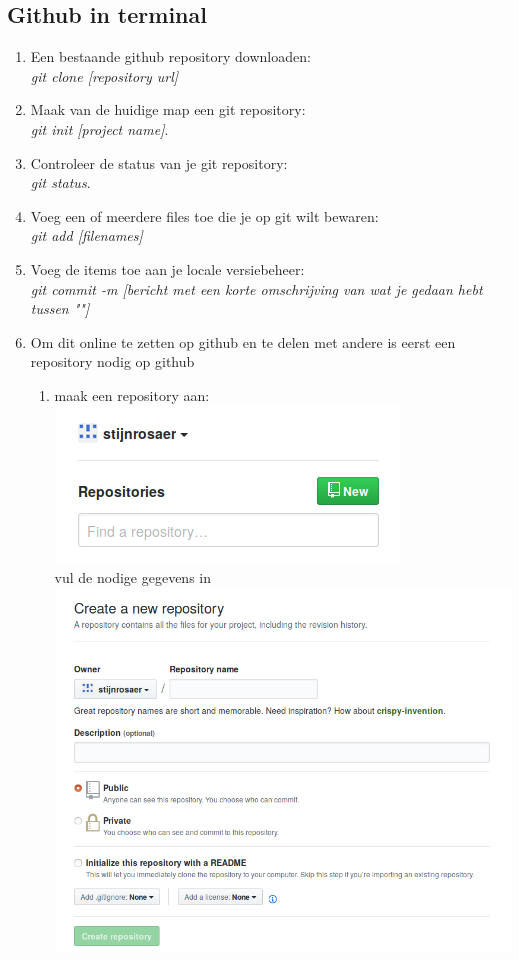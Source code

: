 \documentclass[a4paper, titlepage]{article}
\begin{document}
		\subsection{Github in terminal}
			\begin{enumerate}
				\item Een bestaande github repository downloaden:\\ \textit{git clone [repository url]}
				\item Maak van de huidige map een git repository:\\ \textit{git init [project name]}.
				\item Controleer de status van je git repository:\\ \textit{git status}.
				\item Voeg een of meerdere files toe die je op git wilt bewaren:\\ \textit{git add [filenames]}
				\item Voeg de items toe aan je locale versiebeheer:\\ \textit{git commit -m [bericht met een korte omschrijving van wat je gedaan hebt tussen ""]}
				\item Om dit online te zetten op github en te delen met andere is eerst een repository nodig op github
				\begin{enumerate}
					\item maak een repository aan:\\ \includegraphics[scale=0.3]{img/maakrepo}\\ vul de nodige gegevens in\\ \includegraphics[scale=0.2]{img/maakrepo2}

\end{enumerate}
\end{enumerate}
\end{document}
